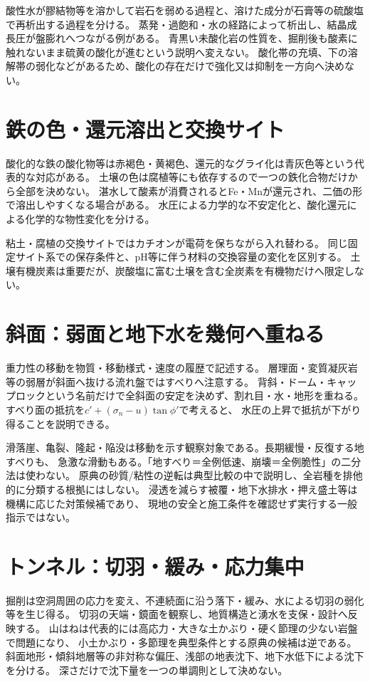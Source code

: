 酸性水が膠結物等を溶かして岩石を弱める過程と、溶けた成分が石膏等の硫酸塩で再析出する過程を分ける。
蒸発・過飽和・水の経路によって析出し、結晶成長圧が盤膨れへつながる例がある。
青黒い未酸化岩の性質を、掘削後も酸素に触れないまま硫黄の酸化が進むという説明へ変えない。
酸化帯の充填、下の溶解帯の弱化などがあるため、酸化の存在だけで強化又は抑制を一方向へ決めない。\cite{eng52_weathering}

\section{鉄の色・還元溶出と交換サイト}\label{theory:engineering:soilredox}
酸化的な鉄の酸化物等は赤褐色・黄褐色、還元的なグライ化は青灰色等という代表的な対応がある。
土壌の色は腐植等にも依存するので一つの鉄化合物だけから全部を決めない。
湛水して酸素が消費されるとFe・Mnが還元され、二価の形で溶出しやすくなる場合がある。\cite{eng52_soil_colour}
水圧による力学的な不安定化と、酸化還元による化学的な物性変化を分ける。

粘土・腐植の交換サイトではカチオンが電荷を保ちながら入れ替わる。
同じ固定サイト系での保存条件と、pH等に伴う材料の交換容量の変化を区別する。
土壌有機炭素は重要だが、炭酸塩に富む土壌を含む全炭素を有機物だけへ限定しない。

\section{斜面：弱面と地下水を幾何へ重ねる}\label{theory:engineering:landslide}
重力性の移動を物質・移動様式・速度の履歴で記述する。
層理面・変質凝灰岩等の弱層が斜面へ抜ける流れ盤ではすべりへ注意する。
背斜・ドーム・キャップロックという名前だけで全斜面の安定を決めず、割れ目・水・地形を重ねる。\cite{eng52_slip_weaklayer}
すべり面の抵抗を\(c'+(\sigma_n-u)\tan\phi'\)で考えると、
水圧の上昇で抵抗が下がり得ることを説明できる。

滑落崖、亀裂、隆起・陥没は移動を示す観察対象である。長期緩慢・反復する地すべりも、
急激な滑動もある。「地すべり＝全例低速、崩壊＝全例脆性」の二分法は使わない。
原典の砂質/粘性の逆転は典型比較の中で説明し、全岩種を排他的に分類する根拠にはしない。\cite{eng52_landslide_ref}
浸透を減らす被覆・地下水排水・押え盛土等は機構に応じた対策候補であり、
現地の安全と施工条件を確認せず実行する一般指示ではない。

\section{トンネル：切羽・緩み・応力集中}\label{theory:engineering:tunnel}
掘削は空洞周囲の応力を変え、不連続面に沿う落下・緩み、水による切羽の弱化等を生じ得る。
切羽の天端・鏡面を観察し、地質構造と湧水を支保・設計へ反映する。\cite{eng52_tunnel_ref}
山はねは代表的には高応力・大きな土かぶり・硬く節理の少ない岩盤で問題になり、
小土かぶり・多節理を典型条件とする原典の候補は逆である。\cite{eng52_rockburst}
斜面地形・傾斜地層等の非対称な偏圧、浅部の地表沈下、地下水低下による沈下を分ける。
深さだけで沈下量を一つの単調則として決めない。

